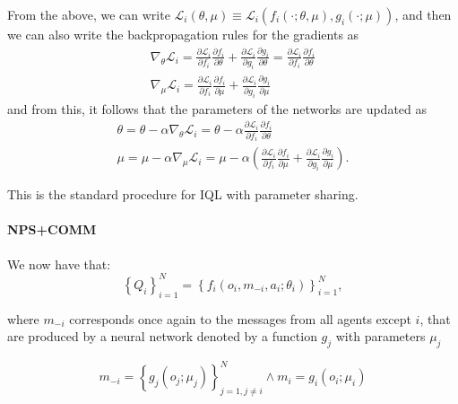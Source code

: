 \documentclass{article}
\begin{document}
From the above, we can write $\mathcal{L}_i(\theta, \mu) \equiv \mathcal{L}_i\left(f_i(\cdot ; \theta, \mu), g_i(\cdot ; \mu)\right)$, and then we can also write the backpropagation rules for the gradients as
\begin{equation}
\begin{gathered}
\nabla_\theta \mathcal{L}_i=\frac{\partial \mathcal{L}_i}{\partial f_i} \frac{\partial f_i}{\partial \theta}+\frac{\partial \mathcal{L}_i}{\partial g_i} \frac{\partial g_i}{\partial \theta}=\frac{\partial \mathcal{L}_i}{\partial f_i} \frac{\partial f_i}{\partial \theta} \\
\nabla_\mu \mathcal{L}_i=\frac{\partial \mathcal{L}_i}{\partial f_i} \frac{\partial f_i}{\partial \mu}+\frac{\partial \mathcal{L}_i}{\partial g_i} \frac{\partial g_i}{\partial \mu}
\end{gathered}
\end{equation}
and from this, it follows that the parameters of the networks are updated as
\begin{equation}
\begin{gathered}
\theta=\theta-\alpha \nabla_\theta \mathcal{L}_i=\theta-\alpha \frac{\partial \mathcal{L}_i}{\partial f_i} \frac{\partial f_i}{\partial \theta} \\
\mu=\mu-\alpha \nabla_\mu \mathcal{L}_i=\mu-\alpha\left(\frac{\partial \mathcal{L}_i}{\partial f_i} \frac{\partial f_i}{\partial \mu}+\frac{\partial \mathcal{L}_i}{\partial g_i} \frac{\partial g_i}{\partial \mu}\right) .
\end{gathered}
\end{equation}

This is the standard procedure for IQL with parameter sharing. 

\paragraph{NPS+COMM} We now have that:
\begin{equation}
\left\{Q_i\right\}_{i=1}^N=\left\{f_i\left(o_i, m_{-i}, a_i ; \theta_i\right)\right\}_{i=1}^N,
\end{equation}

where $m_{-i}$ corresponds once again to the messages from all agents except $i$, that are produced by a neural network denoted by a function $g_j$ with parameters $\mu_j$

\begin{equation}\label{eq:iql_ps_message}
m_{-i}=\left\{g_j\left(o_j ; \mu_j\right)\right\}_{j=1, j \neq i}^N \wedge m_i=g_i\left(o_i ; \mu_i\right)
\end{equation}
\end{document}
